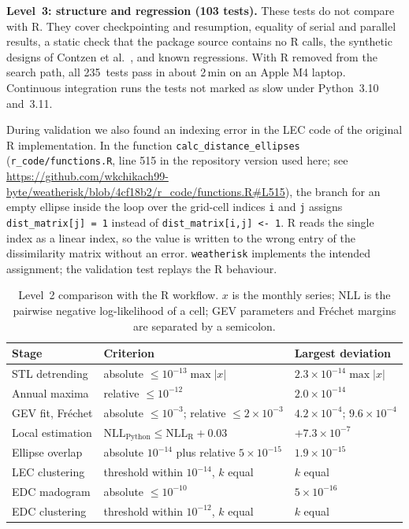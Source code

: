 \documentclass[preprint,12pt,a4paper]{elsarticle}
\newcommand{\revt}[1]{{#1}}
\begin{document}
\textbf{Level~3: structure and regression (103 tests).}
These tests do not compare with R. They cover checkpointing and
resumption, equality of serial and parallel results, a static check
that the package source contains no R calls, the synthetic designs of
Contzen et al.~\cite{contzen2025}, and known regressions. With R
removed from the search path, all 235~tests pass in about 2\,min on
an Apple M4 laptop. Continuous integration runs the tests not marked
as slow under Python~3.10 and~3.11.

During validation we also found an indexing error in the LEC code of
the original R implementation. In the function
\texttt{calc\_distance\_ellipses} (\texttt{r\_code/functions.R},
line 515 in the repository version used here\revt{; see
\url{https://github.com/wkchikach99-byte/weatherisk/blob/4cf18b2/r_code/functions.R\#L515}}),
the branch for an empty ellipse inside the loop over the grid-cell
indices \texttt{i} and \texttt{j} assigns \texttt{dist\_matrix[j] = 1}
instead of \texttt{dist\_matrix[i,j] <- 1}. R reads the single index as a linear index, so the value is written
to the wrong entry of the dissimilarity matrix without an error.
\texttt{weatherisk} implements the intended assignment; the
validation test replays the R behaviour.

\begin{table}[!htbp]
\centering
\small
\setlength{\tabcolsep}{4pt}
\begin{tabularx}{\textwidth}{>{\raggedright\arraybackslash}p{3.6cm}>{\raggedright\arraybackslash}X>{\raggedright\arraybackslash}p{3.0cm}}
\toprule
\textbf{Stage} & \textbf{Criterion} & \textbf{Largest deviation} \\
\midrule
STL detrending & absolute $\leq 10^{-13}\max|x|$ & \mbox{$2.3{\times}10^{-14}\max|x|$} \\
Annual maxima & relative $\leq 10^{-12}$ & $2.0\times10^{-14}$ \\
GEV fit, Fr\'{e}chet & absolute $\leq 10^{-3}$; relative $\leq 2\times10^{-3}$ & $4.2\times10^{-4}$; $9.6\times10^{-4}$ \\
Local estimation & $\mathrm{NLL}_{\text{Python}} \leq \mathrm{NLL}_{\text{R}} + 0.03$ & $+7.3\times10^{-7}$ \\
Ellipse overlap & absolute $10^{-14}$ plus relative $5\times10^{-15}$ & $1.9\times10^{-15}$ \\
LEC clustering & threshold within $10^{-14}$, $k$ equal & $k$ equal \\
EDC madogram & absolute $\leq 10^{-10}$ & $5\times10^{-16}$ \\
EDC clustering & threshold within $10^{-12}$, $k$ equal & $k$ equal \\
\bottomrule
\end{tabularx}
\caption{Level~2 comparison with the R workflow. $x$ is the monthly
  series; NLL is the pairwise negative log-likelihood of a cell; GEV
  parameters and Fr\'{e}chet margins are separated by a semicolon.}
\label{tab:pipeline-parity}
\end{table}
\end{document}
